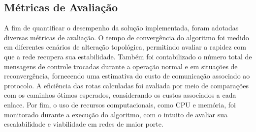 \documentclass[12pt]{article}
\begin{document}
\subsection{Métricas de Avaliação}

A fim de quantificar o desempenho da solução implementada, foram adotadas diversas métricas de avaliação. O tempo de convergência do algoritmo foi medido em diferentes cenários de alteração topológica, permitindo avaliar a rapidez com que a rede recupera sua estabilidade. Também foi contabilizado o número total de mensagens de controle trocadas durante a operação normal e em situações de reconvergência, fornecendo uma estimativa do custo de comunicação associado ao protocolo. A eficiência das rotas calculadas foi avaliada por meio de comparações com os caminhos ótimos esperados, considerando os custos associados a cada enlace. Por fim, o uso de recursos computacionais, como CPU e memória, foi monitorado durante a execução do algoritmo, com o intuito de avaliar sua escalabilidade e viabilidade em redes de maior porte.




\end{document}
